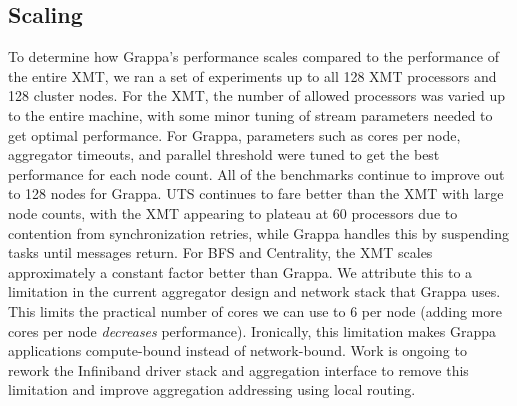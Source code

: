 \subsection{Scaling}
%
%
To determine how Grappa's performance scales compared to the performance of the entire XMT, we ran a set of experiments up to all 128 XMT processors and 128 cluster nodes. For the XMT, the number of allowed processors was varied up to the entire machine, with some minor tuning of stream parameters needed to get optimal performance. For Grappa, parameters such as cores per node, aggregator timeouts, and parallel threshold were tuned to get the best performance for each node count. All of the benchmarks continue to improve out to 128 nodes for Grappa. UTS continues to fare better than the XMT with large node counts, with the XMT appearing to plateau at 60 processors due to contention from synchronization retries, while Grappa handles this by suspending tasks until messages return. For BFS and Centrality, the XMT scales approximately a constant factor better than Grappa. We attribute this to a limitation in the current aggregator design and network stack that Grappa uses.  This limits the practical number of cores we can use to 6 per node (adding more cores per node \emph{decreases} performance).  Ironically, this limitation makes Grappa applications compute-bound instead of network-bound.  Work is ongoing to rework the Infiniband driver stack and aggregation interface to remove this limitation and improve aggregation addressing using local routing.

